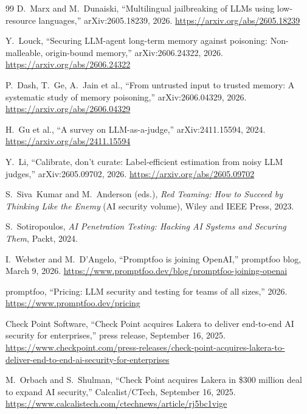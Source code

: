 \begin{thebibliography}{99}
 D.~Marx and M.~Dunaiski, ``Multilingual jailbreaking of LLMs
using low-resource languages,'' arXiv:2605.18239, 2026.
\url{https://arxiv.org/abs/2605.18239}

 Y.~Louck, ``Securing LLM-agent long-term memory against
poisoning: Non-malleable, origin-bound memory,'' arXiv:2606.24322, 2026.
\url{https://arxiv.org/abs/2606.24322}

 P.~Dash, T.~Ge, A.~Jain et al., ``From untrusted
input to trusted memory: A systematic study of memory poisoning,''
arXiv:2606.04329, 2026. \url{https://arxiv.org/abs/2606.04329}

 H.~Gu et al., ``A survey on LLM-as-a-judge,''
arXiv:2411.15594, 2024. \url{https://arxiv.org/abs/2411.15594}

 Y.~Li, ``Calibrate, don't curate: Label-efficient
estimation from noisy LLM judges,'' arXiv:2605.09702, 2026.
\url{https://arxiv.org/abs/2605.09702}

 S.~Siva~Kumar and M.~Anderson (eds.), \emph{Red
Teaming: How to Succeed by Thinking Like the Enemy} (AI security volume), Wiley
and IEEE Press, 2023.

 S.~Sotiropoulos, \emph{AI Penetration Testing: Hacking
AI Systems and Securing Them}, Packt, 2024.

 I.~Webster and M.~D'Angelo, ``Promptfoo is joining
OpenAI,'' promptfoo blog, March 9, 2026.
\url{https://www.promptfoo.dev/blog/promptfoo-joining-openai}

 promptfoo, ``Pricing: LLM security and testing for
teams of all sizes,'' 2026. \url{https://www.promptfoo.dev/pricing}

 Check Point Software, ``Check Point acquires Lakera
to deliver end-to-end AI security for enterprises,'' press release,
September 16, 2025.
\url{https://www.checkpoint.com/press-releases/check-point-acquires-lakera-to-deliver-end-to-end-ai-security-for-enterprises}

 M.~Orbach and S.~Shulman, ``Check Point acquires Lakera
in \$300 million deal to expand AI security,'' Calcalist/CTech, September 16,
2025. \url{https://www.calcalistech.com/ctechnews/article/rj5bc1vige}


\end{thebibliography}
